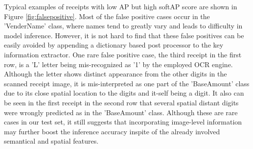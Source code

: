 \documentclass[10pt,twocolumn,letterpaper]{article}
\begin{document}
Typical examples of receipts with low AP but high softAP score are shown in Figure \ref{fig:falsepositive}. Most of the false positive cases occur in the 'VenderName' class, where names tend to greatly vary and leads to difficulty in model inference. However, it is not hard to find that these false positives can be easily avoided by appending a dictionary based post processor to the key information extractor. One rare false positive case, the third receipt in the first row, is a 'L' letter being mis-recognized as '1' by the employed OCR engine. Although the letter shows distinct appearance from the other digits in the scanned receipt image, it is mis-interpreted as one part of the 'BaseAmount' class due to its close spatial location to the digits and it-self being a digit. It also can be seen in the first receipt in the second row that several spatial distant digits were wrongly predicted as in the 'BaseAmount' class. Although these are rare cases in our test set, it still suggests that incorporating image-level information may further boost the inference accuracy inspite of the already involved semantical and spatial features. 
\end{document}
